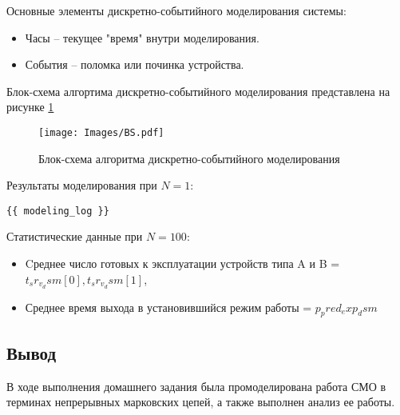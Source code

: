 Основные элементы дискретно-событийного моделирования системы:
\begin{itemize}
    \item Часы -- текущее "время" внутри моделирования.
    \item События -- поломка или починка устройства.
\end{itemize}
Блок-схема алгортима дискретно-событийного моделирования представлена на рисунке \ref{BS}

\begin{figure}[H]
\centerline{\texttt{[image: Images/BS.pdf]}}
\caption{Блок-схема алгоритма дискретно-событийного моделирования}
\label{BS}
\end{figure}

Результаты моделирования при $N=1$:
\scriptsize
\begin{verbatim}
{{ modeling_log }}
\end{verbatim}
\normalsize

Статистические данные при $N=100$:
\begin{itemize}
    \item Cреднее число готовых к эксплуатации устройств типа A и B = $ {{ t_sr_v_dsm[0] }}, {{ t_sr_v_dsm[1] }} $,
    \item Среднее время выхода в установившийся режим работы = $ {{ p_pred_exp_dsm }} $
\end{itemize}
\subsection{Вывод}
В ходе выполнения домашнего задания была промоделирована работа СМО в терминах непрерывных марковских цепей,
а также выполнен анализ ее работы.


